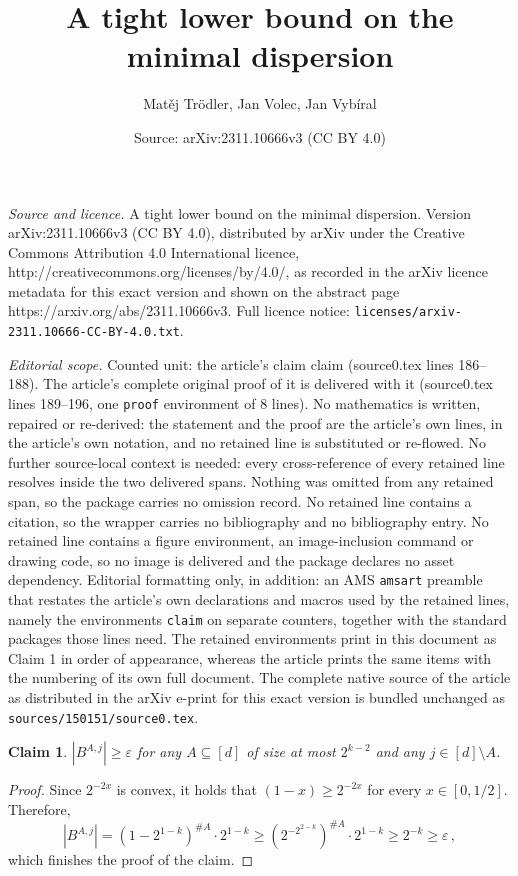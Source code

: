 \documentclass[10pt,a4paper]{amsart}
\title{A tight lower bound on the minimal dispersion}
\author{Mat\v{e}j Tr\"odler, Jan Volec, Jan Vyb\'iral}
\date{Source: arXiv:2311.10666v3 (CC BY 4.0)}
\newtheorem{claim}{Claim}
\newcommand{\eps}{\varepsilon}
\begin{document}
\maketitle

\noindent\emph{Source and licence.} A tight lower bound on the minimal dispersion. Version arXiv:2311.10666v3 (CC BY 4.0), distributed by arXiv under the Creative Commons Attribution 4.0 International licence, http://creativecommons.org/licenses/by/4.0/, as recorded in the arXiv licence metadata for this exact version and shown on the abstract page https://arxiv.org/abs/2311.10666v3. Full licence notice: \texttt{licenses/arxiv-2311.10666-CC-BY-4.0.txt}.\par\smallskip

\noindent\textit{Editorial scope.} Counted unit: the article's claim claim (source0.tex lines 186--188). The article's complete original proof of it is delivered with it (source0.tex lines 189--196, one \texttt{proof} environment of 8 lines). No mathematics is written, repaired or re-derived: the statement and the proof are the article's own lines, in the article's own notation, and no retained line is substituted or re-flowed.  No further source-local context is needed: every cross-reference of every retained line resolves inside the two delivered spans.  Nothing was omitted from any retained span, so the package carries no omission record.  No retained line contains a citation, so the wrapper carries no bibliography and no bibliography entry.  No retained line contains a figure environment, an image-inclusion command or drawing code, so no image is delivered and the package declares no asset dependency.  Editorial formatting only, in addition: an AMS \texttt{amsart} preamble that restates the article's own declarations and macros used by the retained lines, namely the environments \texttt{claim} on separate counters, together with the standard packages those lines need.  The retained environments print in this document as Claim 1 in order of appearance, whereas the article prints the same items with the numbering of its own full document.  The complete native source of the article as distributed in the arXiv e-print for this exact version is bundled unchanged as \texttt{sources/150151/source0.tex}.
\begin{claim}
$\left|B^{A,j}\right| \ge \eps$ for any $A \subseteq [d]$ of size at most $2^{k-2}$ and any $j\in [d]\setminus A$.
\end{claim}

\begin{proof}
Since $2^{-2x}$ is convex, it holds that $(1-x) \ge 2^{-2x}$ for every $x\in[0,1/2]$.
Therefore,
\[
\left|B^{A,j}\right| = \left(1-2^{1-k}\right)^{\# A} \cdot 2^{1-k} \ge \left(2^{-2^{2-k}}\right)^{\# A} \cdot 2^{1 - k} \ge 2^{-k} \ge \eps
\,,\]
which finishes the proof of the claim.
\end{proof}
\end{document}
